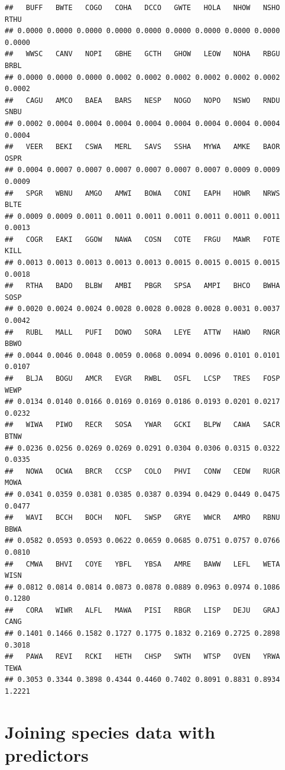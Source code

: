 \documentclass[12pt,]{book}
\begin{document}
\begin{verbatim}
##   BUFF   BWTE   COGO   COHA   DCCO   GWTE   HOLA   NHOW   NSHO   RTHU 
## 0.0000 0.0000 0.0000 0.0000 0.0000 0.0000 0.0000 0.0000 0.0000 0.0000 
##   WWSC   CANV   NOPI   GBHE   GCTH   GHOW   LEOW   NOHA   RBGU   BRBL 
## 0.0000 0.0000 0.0000 0.0002 0.0002 0.0002 0.0002 0.0002 0.0002 0.0002 
##   CAGU   AMCO   BAEA   BARS   NESP   NOGO   NOPO   NSWO   RNDU   SNBU 
## 0.0002 0.0004 0.0004 0.0004 0.0004 0.0004 0.0004 0.0004 0.0004 0.0004 
##   VEER   BEKI   CSWA   MERL   SAVS   SSHA   MYWA   AMKE   BAOR   OSPR 
## 0.0004 0.0007 0.0007 0.0007 0.0007 0.0007 0.0007 0.0009 0.0009 0.0009 
##   SPGR   WBNU   AMGO   AMWI   BOWA   CONI   EAPH   HOWR   NRWS   BLTE 
## 0.0009 0.0009 0.0011 0.0011 0.0011 0.0011 0.0011 0.0011 0.0011 0.0013 
##   COGR   EAKI   GGOW   NAWA   COSN   COTE   FRGU   MAWR   FOTE   KILL 
## 0.0013 0.0013 0.0013 0.0013 0.0013 0.0015 0.0015 0.0015 0.0015 0.0018 
##   RTHA   BADO   BLBW   AMBI   PBGR   SPSA   AMPI   BHCO   BWHA   SOSP 
## 0.0020 0.0024 0.0024 0.0028 0.0028 0.0028 0.0028 0.0031 0.0037 0.0042 
##   RUBL   MALL   PUFI   DOWO   SORA   LEYE   ATTW   HAWO   RNGR   BBWO 
## 0.0044 0.0046 0.0048 0.0059 0.0068 0.0094 0.0096 0.0101 0.0101 0.0107 
##   BLJA   BOGU   AMCR   EVGR   RWBL   OSFL   LCSP   TRES   FOSP   WEWP 
## 0.0134 0.0140 0.0166 0.0169 0.0169 0.0186 0.0193 0.0201 0.0217 0.0232 
##   WIWA   PIWO   RECR   SOSA   YWAR   GCKI   BLPW   CAWA   SACR   BTNW 
## 0.0236 0.0256 0.0269 0.0269 0.0291 0.0304 0.0306 0.0315 0.0322 0.0335 
##   NOWA   OCWA   BRCR   CCSP   COLO   PHVI   CONW   CEDW   RUGR   MOWA 
## 0.0341 0.0359 0.0381 0.0385 0.0387 0.0394 0.0429 0.0449 0.0475 0.0477 
##   WAVI   BCCH   BOCH   NOFL   SWSP   GRYE   WWCR   AMRO   RBNU   BBWA 
## 0.0582 0.0593 0.0593 0.0622 0.0659 0.0685 0.0751 0.0757 0.0766 0.0810 
##   CMWA   BHVI   COYE   YBFL   YBSA   AMRE   BAWW   LEFL   WETA   WISN 
## 0.0812 0.0814 0.0814 0.0873 0.0878 0.0889 0.0963 0.0974 0.1086 0.1280 
##   CORA   WIWR   ALFL   MAWA   PISI   RBGR   LISP   DEJU   GRAJ   CANG 
## 0.1401 0.1466 0.1582 0.1727 0.1775 0.1832 0.2169 0.2725 0.2898 0.3018 
##   PAWA   REVI   RCKI   HETH   CHSP   SWTH   WTSP   OVEN   YRWA   TEWA 
## 0.3053 0.3344 0.3898 0.4344 0.4460 0.7402 0.8091 0.8831 0.8934 1.2221
\end{verbatim}

\hypertarget{joining-species-data-with-predictors}{%
\section{Joining species data with predictors}\label{joining-species-data-with-predictors}}
\end{document}
